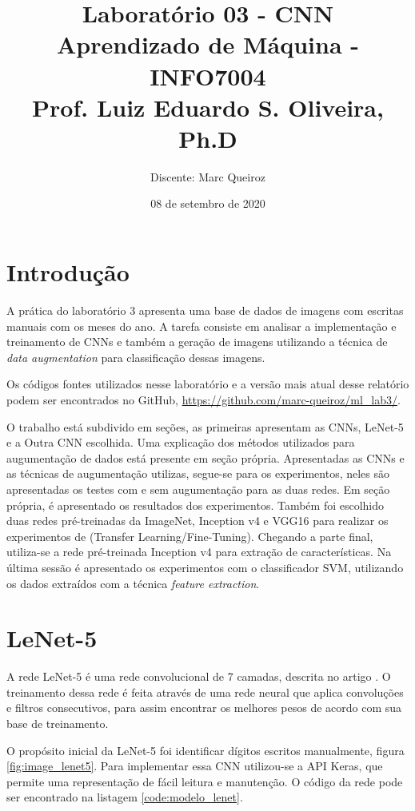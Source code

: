 \documentclass[12pt,
	english,			%
	french,				%
	spanish,			%
	brazil,				%
	]{article}
\title{Laboratório 03 - CNN\\
\Large{Aprendizado de Máquina - INFO7004}\\
\Large{Prof. Luiz Eduardo S. Oliveira, Ph.D}}
\author{Discente: Marc Queiroz}
\date{08 de setembro de 2020}
\begin{document}
\maketitle

\section{Introdução}

A prática do laboratório 3 apresenta uma base de dados de imagens com escritas manuais com os meses do ano. A tarefa consiste em analisar a implementação e treinamento de CNNs e também a geração de imagens utilizando a técnica de \textit{data augmentation} para classificação dessas imagens.

Os códigos fontes utilizados nesse laboratório e a versão mais atual desse relatório podem ser encontrados no GitHub, \url{https://github.com/marc-queiroz/ml_lab3/}.

O trabalho está subdivido em seções, as primeiras apresentam as CNNs, LeNet-5 e a Outra CNN escolhida. Uma explicação dos métodos utilizados para augumentação de dados está presente em seção própria. Apresentadas as CNNs e as técnicas de augumentação utilizas, segue-se para os experimentos, neles são apresentadas os testes com e sem augumentação para as duas redes. Em seção própria, é apresentado os resultados dos experimentos. Também foi escolhido duas redes pré-treinadas da ImageNet, Inception v4 e VGG16 para realizar os experimentos de (Transfer Learning/Fine-Tuning). Chegando a parte final, utiliza-se a rede pré-treinada Inception v4 para extração de características. Na última sessão é apresentado os experimentos com o classificador SVM, utilizando os dados extraídos com a técnica \textit{feature extraction}. 

\section{LeNet-5}

A rede LeNet-5 é uma rede convolucional de 7 camadas, descrita no artigo \cite{Lecun98gradient-basedlearning}. O treinamento dessa rede é feita através de uma rede neural que aplica convoluções e filtros consecutivos, para assim encontrar os melhores pesos de acordo com sua base de treinamento.

O propósito inicial da LeNet-5 foi identificar dígitos escritos manualmente, figura \ref{fig:image_lenet5}. Para implementar essa CNN utilizou-se a API Keras, que permite uma representação de fácil leitura e manutenção. O código da rede pode ser encontrado na listagem \ref{code:modelo_lenet}.
\end{document}
